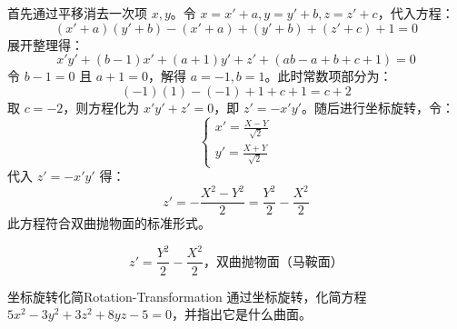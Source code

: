 \begin{solution}
    首先通过平移消去一次项 $x, y$。令 $x = x' + a, y = y' + b, z = z' + c$，代入方程：
    \begin{equation*}
        (x' + a)(y' + b) - (x' + a) + (y' + b) + (z' + c) + 1 = 0
    \end{equation*}
    展开整理得：
    \begin{equation*}
        x'y' + (b - 1)x' + (a + 1)y' + z' + (ab - a + b + c + 1) = 0
    \end{equation*}
    令 $b - 1 = 0$ 且 $a + 1 = 0$，解得 $a = -1, b = 1$。此时常数项部分为：
    \begin{equation*}
        (-1)(1) - (-1) + 1 + c + 1 = c + 2
    \end{equation*}
    取 $c = -2$，则方程化为 $x'y' + z' = 0$，即 $z' = -x'y'$。随后进行坐标旋转，令：
    \begin{equation*}
        \begin{cases}
            x' = \frac{X - Y}{\sqrt{2}} \\
            y' = \frac{X + Y}{\sqrt{2}}
        \end{cases}
    \end{equation*}
    代入 $z' = -x'y'$ 得：
    \begin{equation*}
        z' = -\frac{X^2 - Y^2}{2} = \frac{Y^2}{2} - \frac{X^2}{2}
    \end{equation*}
    此方程符合双曲抛物面的标准形式。

    \begin{equation*}
        \boxed{z' = \frac{Y^2}{2} - \frac{X^2}{2}，\text{双曲抛物面（马鞍面）}}
    \end{equation*}
\end{solution}

\begin{problem}{坐标旋转化简}{Rotation-Transformation}
    通过坐标旋转，化简方程 $5x^2 - 3y^2 + 3z^2 + 8yz - 5 = 0$，并指出它是什么曲面。
\end{problem}

